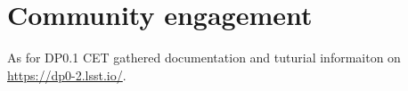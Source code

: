 \section{Community engagement} \label{sec:cet}

As for DP0.1 CET gathered documentation and tuturial informaiton on \url{https://dp0-2.lsst.io/}.

